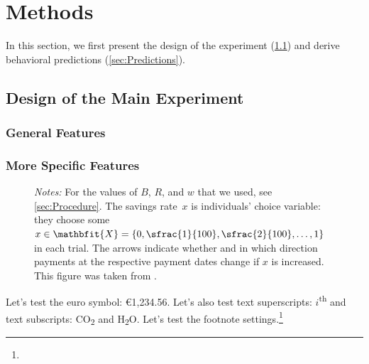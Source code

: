 



\section{Methods}
\label{sec:Methods}

In this section, we first present the design of the experiment (\ref{sec:design}) and derive behavioral predictions (\ref{sec:Predictions}).

\subsection{Design of the Main Experiment}
\label{sec:design}

\subsubsection{General Features}
\blindtext

\subsubsection{More Specific Features}
\blindtext

\begin{figure}[tp!]
	\RawFloats
	\centering
	
	\smallskip
	
	\bigskip
	\begin{minipage}{\textwidth}%
		\footnotesize\setlength{\baselineskip}{11pt}%
		\textit{Notes:} For the values of $B$, $R$, and $w$ that we used, see \autoref{sec:Procedure}. The savings rate~$x$ is individuals' choice variable: they choose some $x \in \mathbfit{X} = {\{0, \sfrac{1}{100}, \sfrac{2}{100}, \dots, 1\}}$ in each trial.
		The arrows indicate whether and in which direction payments at the respective payment dates change if $x$ is increased.
		This figure was taken from \cite{Dertwinkel-Kalt2017}.
	\end{minipage}
\end{figure}

Let's test the euro symbol: \euro 1,234.56. Let's also test text superscripts: $i$\textsuperscript{th} and text subscripts: CO\textsubscript{2} and H\textsubscript{2}O.
\blindtext
Let's test the footnote settings.\footnote{\blindmathfalse\blindtext\blindmathtrue} 

